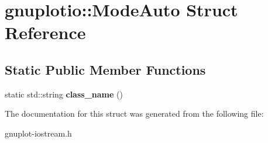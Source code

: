 \hypertarget{structgnuplotio_1_1ModeAuto}{}\section{gnuplotio\+:\+:Mode\+Auto Struct Reference}
\label{structgnuplotio_1_1ModeAuto}
\subsection*{Static Public Member Functions}
\begin{DoxyCompactItemize}
\item 
\mbox{\label{structgnuplotio_1_1ModeAuto_ac73f89a782ac32dd8bc7b8f7a7581523}} 
static std\+::string {\bfseries class\+\_\+name} ()
\end{DoxyCompactItemize}


The documentation for this struct was generated from the following file\+:\begin{DoxyCompactItemize}
\item 
gnuplot-\/iostream.\+h\end{DoxyCompactItemize}
